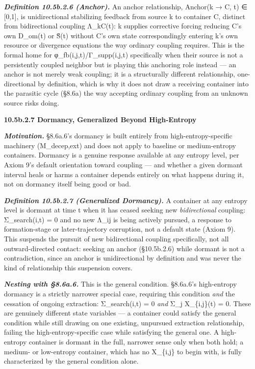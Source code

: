 \documentclass[
]{article}
\begin{document}
\emph{\textbf{Definition 10.5b.2.6 (Anchor).}} An anchor relationship,
Anchor(k → C, t) ∈ {[}0,1{]}, is unidirectional stabilizing feedback
from source k to container C, distinct from bidirectional coupling
Λ\_kC(t): k supplies corrective forcing reducing C's own D\_om(t) or
S̃(t) without C's own state correspondingly entering k's own resource or
divergence equations the way ordinary coupling requires. This is the
formal home for φ\_fb(i,j,t)/Γ\_supp(i,j,t) specifically when their
source is not a persistently coupled neighbor but is playing this
anchoring role instead --- an anchor is not merely weak coupling; it is
a structurally different relationship, one-directional by definition,
which is why it does not draw a receiving container into the parasitic
cycle (§8.6a) the way accepting ordinary coupling from an unknown source
risks doing.

\textbf{10.5b.2.7 Dormancy, Generalized Beyond High-Entropy}

\emph{\textbf{Motivation.}} §8.6a.6's dormancy is built entirely from
high-entropy-specific machinery (M\_decep,ext) and does not apply to
baseline or medium-entropy containers. Dormancy is a genuine response
available at any entropy level, per Axiom 9's default orientation toward
coupling --- and whether a given dormant interval heals or harms a
container depends entirely on what happens during it, not on dormancy
itself being good or bad.

\emph{\textbf{Definition 10.5b.2.7 (Generalized Dormancy).}} A container
at any entropy level is dormant at time t when it has ceased seeking new
\emph{bidirectional} coupling: Σ\_search(i,t) = 0 and no new Λ\_ij is
being actively pursued, a response to formation-stage or
later-trajectory corruption, not a default state (Axiom 9). This
suspends the pursuit of new bidirectional coupling specifically, not all
outward-directed contact: seeking an anchor (§10.5b.2.6) while dormant
is not a contradiction, since an anchor is unidirectional by definition
and was never the kind of relationship this suspension covers.

\emph{\textbf{Nesting with §8.6a.6.}} This is the general condition.
§8.6a.6's high-entropy dormancy is a strictly narrower special case,
requiring this condition \emph{and} the cessation of ongoing extraction:
Σ\_search(i,t) = 0 \emph{and} Σ\_j X\_\{i,j\}(t) = 0. These are
genuinely different state variables --- a container could satisfy the
general condition while still drawing on one existing, unpursued
extraction relationship, failing the high-entropy-specific case while
satisfying the general one. A high-entropy container is dormant in the
full, narrower sense only when both hold; a medium- or low-entropy
container, which has no X\_\{i,j\} to begin with, is fully characterized
by the general condition alone.
\end{document}
